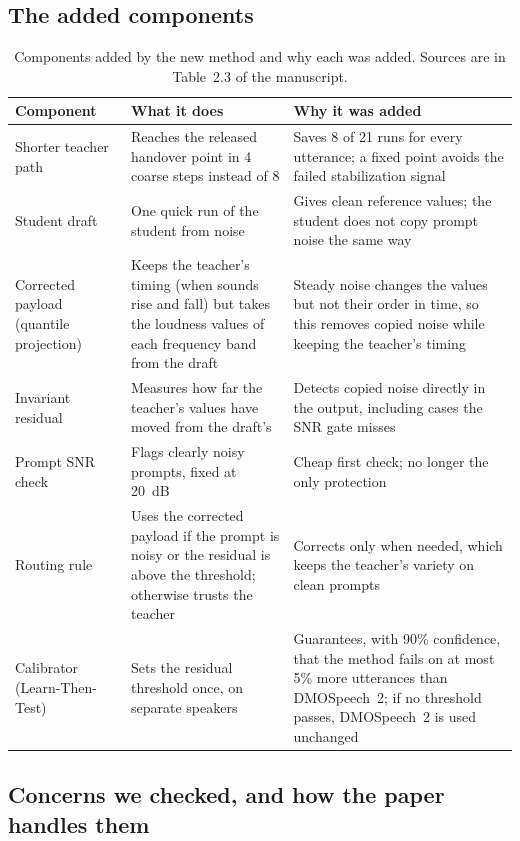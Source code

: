 \documentclass[11pt,a4paper]{article}
\begin{document}
\subsection*{The added components}

\begin{table}[H]
\centering\small
\caption{Components added by the new method and why each was added. Sources are in Table~2.3 of the manuscript.}
\label{tab:newcomp}
\begin{tabularx}{\textwidth}{@{}P{3.3cm} L L@{}}
\toprule
\textbf{Component} & \textbf{What it does} & \textbf{Why it was added} \\
\midrule
Shorter teacher path & Reaches the released handover point in 4 coarse steps instead of 8 & Saves 8 of 21 runs for every utterance; a fixed point avoids the failed stabilization signal \\
Student draft & One quick run of the student from noise & Gives clean reference values; the student does not copy prompt noise the same way \\
Corrected payload (quantile projection) & Keeps the teacher's timing (when sounds rise and fall) but takes the loudness values of each frequency band from the draft & Steady noise changes the values but not their order in time, so this removes copied noise while keeping the teacher's timing \\
Invariant residual & Measures how far the teacher's values have moved from the draft's & Detects copied noise directly in the output, including cases the SNR gate misses \\
Prompt SNR check & Flags clearly noisy prompts, fixed at 20~dB & Cheap first check; no longer the only protection \\
Routing rule & Uses the corrected payload if the prompt is noisy or the residual is above the threshold; otherwise trusts the teacher & Corrects only when needed, which keeps the teacher's variety on clean prompts \\
Calibrator (Learn-Then-Test) & Sets the residual threshold once, on separate speakers & Guarantees, with 90\% confidence, that the method fails on at most 5\% more utterances than DMOSpeech~2; if no threshold passes, DMOSpeech~2 is used unchanged \\
\bottomrule
\end{tabularx}
\end{table}

\subsection*{Concerns we checked, and how the paper handles them}
\end{document}
